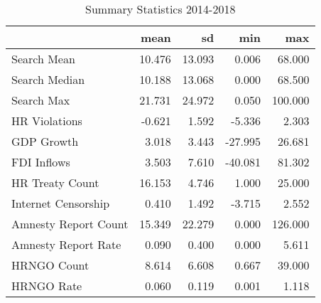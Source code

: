 \begin{table}[ht]
\centering
\begin{tabular}{|l|rrrr|}
  \hline
 & mean & sd & min & max \\ 
  \hline
Search Mean & 10.476 & 13.093 & 0.006 & 68.000 \\ 
  Search Median & 10.188 & 13.068 & 0.000 & 68.500 \\ 
  Search Max & 21.731 & 24.972 & 0.050 & 100.000 \\ 
  HR Violations & -0.621 & 1.592 & -5.336 & 2.303 \\ 
  GDP Growth & 3.018 & 3.443 & -27.995 & 26.681 \\ 
  FDI Inflows & 3.503 & 7.610 & -40.081 & 81.302 \\ 
  HR Treaty Count & 16.153 & 4.746 & 1.000 & 25.000 \\ 
  Internet Censorship & 0.410 & 1.492 & -3.715 & 2.552 \\ 
  Amnesty Report Count & 15.349 & 22.279 & 0.000 & 126.000 \\ 
  Amnesty Report Rate & 0.090 & 0.400 & 0.000 & 5.611 \\ 
  HRNGO Count & 8.614 & 6.608 & 0.667 & 39.000 \\ 
  HRNGO Rate & 0.060 & 0.119 & 0.001 & 1.118 \\ 
   \hline
\end{tabular}
\caption{Summary Statistics 2014-2018} 
\end{table}
